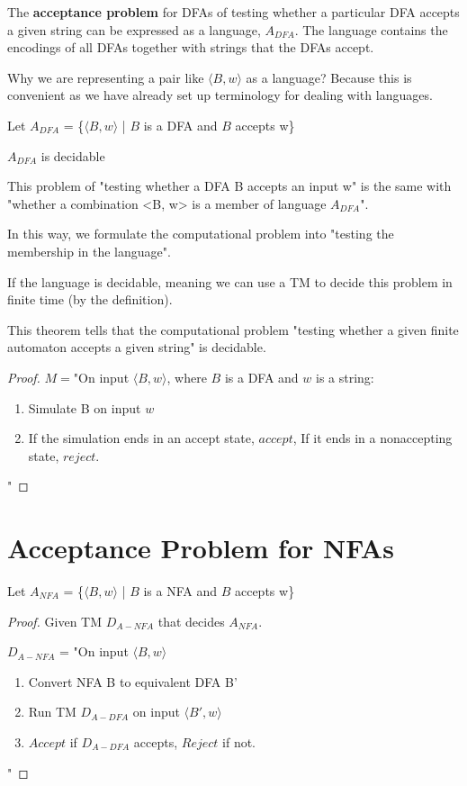 The \textbf{acceptance problem} for DFAs of testing whether a particular DFA accepts a given string can be expressed as a language, \(A_{DFA}\). The language contains the encodings of all DFAs together with strings that the DFAs accept. 

Why we are representing a pair like \(\langle B, w \rangle\) as a language? Because this is convenient as we have already set up terminology for dealing with languages. 

\begin{theorem}
    Let \(A_{DFA}\) = \{\(\langle B, w \rangle\) | \(B\)  is a DFA and \(B\)  accepts w\}

    \(A_{DFA}\) is decidable 
\end{theorem}

This problem of "testing whether a DFA B accepts an input w" is the same with "whether a combination <B, w> is a member of language \(A_{DFA}\)".

In this way, we formulate the computational problem into "testing the membership in the language".

If the language is decidable, meaning we can use a TM to decide this problem in finite time (by the definition).

This theorem tells that the computational problem "testing whether a given finite automaton accepts a given string" is decidable.

\begin{proof}
    \(M = \)"On input \(\langle B, w \rangle\), where \(B\) is a DFA and \(w\) is a string:

    \begin{enumerate}
        \item Simulate B on input \(w\)
        \item If the simulation ends in an accept state, \(accept\), If it ends in a nonaccepting state, \(reject\).   
    \end{enumerate}
    " 
\end{proof}

\section{Acceptance Problem for NFAs}
\begin{theorem}
    Let \(A_{NFA}\) = \{\(\langle B, w \rangle\) | \(B\)  is a NFA and \(B\)  accepts w\}

\end{theorem}
\begin{proof}
    Given TM \(D_{A-NFA}\) that decides \(A_{NFA}\).  

    \(D_{A-NFA}\) = "On input \(\langle B, w \rangle\)
        \begin{enumerate}
            \item Convert NFA B to equivalent DFA B'
            \item Run TM \(D_{A-DFA}\) on input \(\langle B', w \rangle\)
            \item \(Accept\) if \(D_{A-DFA}\) accepts, \(Reject\) if not.
        \end{enumerate} 
        " 
\end{proof}

